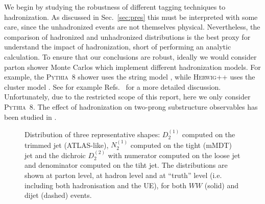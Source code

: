 \documentclass[11pt,letterpaper]{article}
\newcommand{\pythia}{\textsc{Pythia~8}\xspace}
\newcommand{\herwig}{\textsc{Herwig++}\xspace}
\DeclareRobustCommand{\Sec}[1]{Sec.~\ref{#1}}
\DeclareRobustCommand{\Refs}[1]{Refs.~\cite{#1}}
\begin{document}
We begin by studying the robustness of different tagging techniques to hadronization.
%
As discussed in \Sec{sec:pres} this must be interpreted with some care, since the unhadronized events are not themselves physical.
%
Nevertheless, the comparison of hadronized and unhadronized distributions is the best proxy for understand the impact of hadronization, short of performing an analytic calculation.
%
To ensure that our conclusions are robust, ideally we would consider parton shower Monte Carlos which implement different hadronization models.
%
For example, the \pythia shower uses the string model \cite{Andersson:1983ia,Andersson:1998tv}, while \herwig uses the cluster model \cite{Webber:1983if,Marchesini:1987cf}.
%
See for example \Refs{Buckley:2011ms,Skands:2011pf,Skands:2012ts} for a more detailed discussion. Unfortunately, due to the restricted scope of this report, here we only consider \pythia.
%
The effect of hadronization on two-prong substructure observables has been studied in \cite{Larkoski:2015kga,Salam:2016yht,Larkoski:2017iuy,Larkoski:2017cqq}.


\begin{figure}
  \caption{Distribution of three representative shapes: $D_2^{(1)}$
    computed on the trimmed jet (ATLAS-like), $N_2^{(1)}$ computed on
    the tight (mMDT) jet and the dichroic $D_2^{(2)}$ with numerator
    computed on the loose jet and denominator computed on the tiht
    jet. The distributions are shown at parton level, at hadron level
    and at ``truth'' level (i.e. including both hadronisation and the
    UE), for both $WW$ (solid) and dijet (dashed)
    events.}\label{fig:shape-distribution}
\end{figure}
\end{document}
